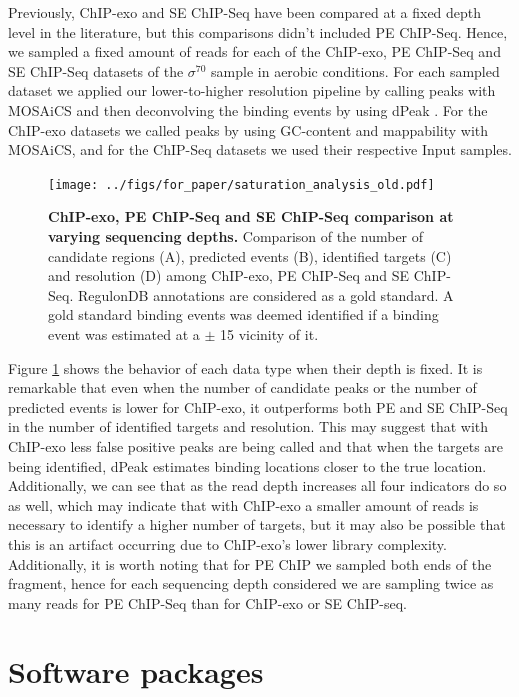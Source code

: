 \documentclass[11pt]{article}\usepackage[]{graphicx}\usepackage[]{color}
\begin{document}
Previously, ChIP-exo and SE ChIP-Seq have been compared at a fixed
depth level in the literature, but this comparisons didn't included PE
ChIP-Seq. Hence, we sampled a fixed amount of reads for each of the
ChIP-exo, PE ChIP-Seq and SE ChIP-Seq datasets of the $\sigma^{70}$
sample in aerobic conditions. For each sampled dataset we applied our
lower-to-higher resolution pipeline by calling peaks with MOSAiCS
\cite{mosaics} and then deconvolving the binding events by using dPeak
\cite{dpeak}. For the ChIP-exo datasets we called peaks by using
GC-content and mappability with MOSAiCS, and for the ChIP-Seq datasets
we used their respective Input samples.

\begin{figure}[H]
  \centering
  \texttt{[image: ../figs/for\_paper/saturation\_analysis\_old.pdf]}
  \caption{\textbf{ChIP-exo, PE ChIP-Seq and SE ChIP-Seq comparison at
      varying sequencing depths.} Comparison of the number of candidate
    regions (A), predicted events (B), identified targets (C) and
    resolution (D) among ChIP-exo, PE ChIP-Seq and SE
    ChIP-Seq. RegulonDB annotations are considered as a gold
    standard. A gold standard binding events was deemed identified if
    a binding event was estimated at a $\pm$ 15 vicinity of
    it.}
  \label{fig:design}
\end{figure}

Figure \ref{fig:design} shows the behavior of each data type when
their depth is fixed. It is remarkable that even when the number of
candidate peaks or the number of predicted events is lower for
ChIP-exo, it outperforms both PE and SE ChIP-Seq in the number of
identified targets and resolution. This may suggest that with ChIP-exo
less false positive peaks are being called and that when the targets
are being identified, dPeak estimates binding locations closer to the
true location. Additionally, we can see that as the read depth
increases all four indicators do so as well, which may indicate that
with ChIP-exo a smaller amount of reads is necessary to identify a
higher number of targets, but it may also be possible that this is an
artifact occurring due to ChIP-exo's lower library
complexity. Additionally, it is worth noting that for PE ChIP we
sampled both ends of the fragment, hence for each sequencing depth
considered we are sampling twice as many reads for PE ChIP-Seq than
for ChIP-exo or SE ChIP-seq.

\section{Software packages}
\label{sec:software}
\end{document}
